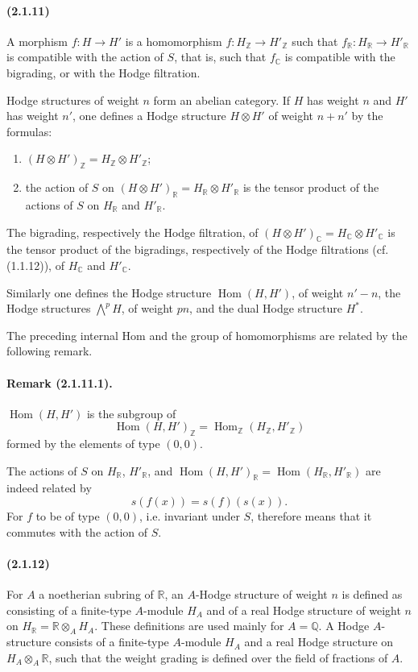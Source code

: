 \documentclass[10pt]{article}
\newcommand{\C}{\mathbb C}
\newcommand{\Q}{\mathbb Q}
\newcommand{\Z}{\mathbb Z}
\newcommand{\Hom}{\operatorname{Hom}}
\newcommand{\R}{\mathbb R}
\begin{document}
\paragraph{(2.1.11)} A morphism $f:H\to H'$ is a homomorphism $f:H_\Z\to H'_\Z$ such that $f_\R:H_\R\to H'_\R$ is compatible with the action of $S$, that is, such that $f_\C$ is compatible with the bigrading, or with the Hodge filtration.

Hodge structures of weight $n$ form an abelian category. If $H$ has weight $n$ and $H'$ has weight $n'$, one defines a Hodge structure $H\otimes H'$ of weight $n+n'$ by the formulas:
\begin{enumerate}[label=\alph*)]
\item $(H\otimes H')_\Z=H_\Z\otimes H'_\Z$;
\item the action of $S$ on $(H\otimes H')_\R=H_\R\otimes H'_\R$ is the tensor product of the actions of $S$ on $H_\R$ and $H'_\R$.
\end{enumerate}
The bigrading, respectively the Hodge filtration, of $(H\otimes H')_\C=H_\C\otimes H'_\C$ is the tensor product of the bigradings, respectively of the Hodge filtrations (cf. (1.1.12)), of $H_\C$ and $H'_\C$.

Similarly one defines the Hodge structure $\Hom(H,H')$, of weight $n'-n$, the Hodge structures $\bigwedge^pH$, of weight $pn$, and the dual Hodge structure $H^*$.

The preceding internal Hom and the group of homomorphisms are related by the following remark.

\paragraph{Remark (2.1.11.1).} $\Hom(H,H')$ is the subgroup of
\[
\Hom(H,H')_\Z=\Hom_\Z(H_\Z,H'_\Z)
\]
formed by the elements of type $(0,0)$.

The actions of $S$ on $H_\R$, $H'_\R$, and $\Hom(H,H')_\R=\Hom(H_\R,H'_\R)$ are indeed related by
\[
s(f(x))=s(f)(s(x)).
\]
For $f$ to be of type $(0,0)$, i.e. invariant under $S$, therefore means that it commutes with the action of $S$.

\paragraph{(2.1.12)} For $A$ a noetherian subring of $\R$, an $A$-Hodge structure of weight $n$ is defined as consisting of a finite-type $A$-module $H_A$ and of a real Hodge structure of weight $n$ on $H_\R=\R\otimes_AH_A$. These definitions are used mainly for $A=\Q$. A Hodge $A$-structure consists of a finite-type $A$-module $H_A$ and a real Hodge structure on $H_A\otimes_A\R$, such that the weight grading is defined over the field of fractions of $A$.
\end{document}
